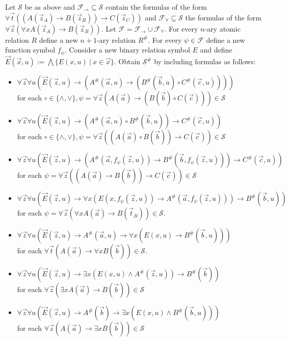 \documentclass[runningheads]{llncs}
\begin{document}
\begin{theorem}\label{fullFOtranslation}
	Let $\mathcal S$ be as above and $\mathcal F_\to\subseteq\mathcal S$ contain the formulas of the form $\forall \vec t((A(\vec z_A)\to B(\vec z_B))\to C(\vec z_C))$ and $\mathcal F_\forall\subseteq\mathcal S$ the formulas of the form $\forall \vec z(\forall xA(\vec z_A)\to B(\vec z_B))$. Let $\mathcal F = \mathcal F_\to\cup\mathcal F_\forall$. For every $n$-ary atomic relation $R$ define a new $n+1$-ary relation $R^\#$. For every $\psi\in\mathcal F$ define a new function symbol $f_\psi$. Consider a new binary relation symbol $E$ and define $\vec E(\vec x, u) := \bigwedge\{E(x, u)\:|\:x\in\vec x\}$. Obtain $\mathcal S^\#$ by including formulas as follows:
	\begin{itemize}
		\item $\forall \vec z\forall u(\vec E(\vec z, u)\to (A^\#(\vec a, u)\to (B^\#(\vec b, u)\circ C^\#(\vec c, u))))$\\for each $\circ\in\{\wedge, \vee\}, \psi = \forall \vec z(A(\vec a)\to (B(\vec b)\circ C(\vec c)))\in\mathcal S$
		\item $\forall \vec z\forall u(\vec E(\vec z, u)\to (A^\#(\vec a, u)\circ B^\#(\vec b, u))\to C^\#(\vec c, u))$\\for each $\circ\in\{\wedge, \vee\}, \psi = \forall \vec z((A(\vec a)\circ B(\vec b))\to C(\vec c))\in\mathcal S$
		\item $\forall \vec z\forall u(\vec E(\vec z, u)\to(A^\#(\vec a, f_\psi(\vec z, u))\to B^\#(\vec b, f_\psi(\vec z, u)))\to C^\#(\vec c, u))$\\for each $\psi = \forall \vec z((A(\vec a)\to B(\vec b))\to C(\vec c))\in\mathcal S$
		\item  $\forall \vec z\forall u(\vec E(\vec z, u)\to \forall x(E(x, f_\psi(\vec z, u))\to A^\#(\vec a, f_\psi(\vec z, u)))\to B^\#(\vec b, u))$\\for each $\psi = \forall \vec z(\forall xA(\vec a)\to B(\vec t_B))\in\mathcal S$.
		\item $\forall \vec z\forall u(\vec E(\vec z, u)\to A^\#(\vec a, u)\to \forall x(E(x, u)\to B^\#(\vec b, u)))$\\for each $\forall \vec t(A(\vec a)\to \forall xB(\vec b))\in\mathcal S$.
		\item $\forall \vec z\forall u(\vec E(\vec z, u)\to \exists x(E(x, u)\wedge A^\#(\vec z, u))\to B^\#(\vec b))$\\for each $\forall \vec z(\exists xA(\vec a)\to B(\vec b))\in\mathcal S$
		\item $\forall \vec z\forall u(\vec E(\vec z, u)\to A^\#(\vec b)\to \exists x(E(x, u)\wedge B^\#(\vec b, u)))$\\for each $\forall \vec z(A(\vec a)\to \exists xB(\vec b))\in\mathcal S$

\end{itemize}
\end{theorem}
\end{document}
